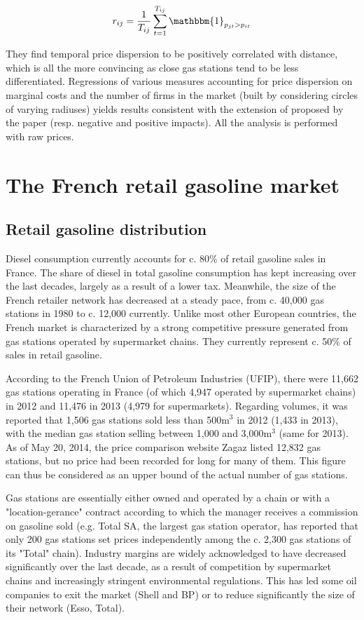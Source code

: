 \documentclass[english]{article}
\begin{document}
\begin{align*}
r_{ij} = \frac{1}{T_{ij}} \sum_{t=1}^{T_{ij}} \mathbbm{1}_{p_{jt} > p_{it}}
\end{align*}

They find temporal price dispersion to be positively correlated with distance, which is all the more convincing as close gas stations tend to be less differentiated. Regressions of various measures accounting for price dispersion on marginal costs and the number of firms in the market (built by considering circles of varying radiuses) yields results consistent with the extension of \cite{VAR80} proposed by the paper (resp. negative and positive impacts). All the analysis is performed with raw prices.

\section{The French retail gasoline market}

\subsection{Retail gasoline distribution}

Diesel consumption currently accounts for c. 80\% of retail gasoline sales in France. The share of diesel in total gasoline consumption has kept increasing over the last decades, largely as a result of a lower tax. Meanwhile, the size of the French retailer network has decreased at a steady pace, from c. 40,000 gas stations in 1980 to c. 12,000 currently.  Unlike most other European countries, the French market is characterized by a strong competitive pressure generated from gas stations operated by supermarket chains. They currently represent c. 50\% of sales in retail gasoline.

According to the French Union of Petroleum Industries (UFIP), there were 11,662 gas stations operating in France (of which 4,947 operated by supermarket chains) in 2012 and 11,476 in 2013 (4,979 for supermarkets). Regarding volumes, it was reported that 1,506 gas stations sold less than 500m$^{3}$ in 2012 (1,433 in 2013), with the median gas station selling between 1,000 and 3,000m$^{3}$ (same for 2013). As of May 20, 2014, the price comparison website Zagaz listed 12,832 gas stations, but no price had been recorded for long for many of them. This figure can thus be considered as an upper bound of the actual number of gas stations.

Gas stations are essentially either owned and operated by a chain or with a "location-gerance" contract according to which the manager receives a commission on gasoline sold (e.g. Total SA, the largest gas station operator, has reported that only 200 gas stations set prices independently among the c. 2,300 gas stations of its "Total" chain). Industry margins are widely acknowledged to have decreased significantly over the last decade, as a result of competition by supermarket chains and increasingly stringent environmental regulations. This has led some oil companies to exit the market (Shell and BP) or to reduce significantly the size of their network (Esso, Total).
\end{document}
